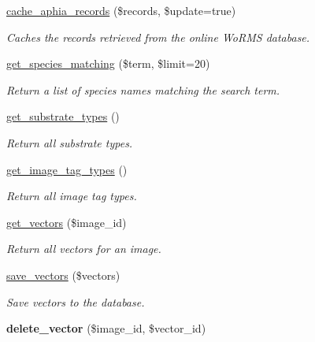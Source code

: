\begin{DoxyCompactItemize}
\item 
\hyperlink{classDatabase_a0fa69e8599adb5307cfc552ac9bf2c0d}{cache\-\_\-aphia\-\_\-records} (\$records, \$update=true)
\begin{DoxyCompactList}\small\item\em Caches the records retrieved from the online Wo\-R\-M\-S database. \end{DoxyCompactList}\item 
\hyperlink{classDatabase_a5972a2838b98ed0b7816a528ac823bec}{get\-\_\-species\-\_\-matching} (\$term, \$limit=20)
\begin{DoxyCompactList}\small\item\em Return a list of species names matching the search term. \end{DoxyCompactList}\item 
\hyperlink{classDatabase_a9549b0da67a3ad1f6e2f569d67e107ec}{get\-\_\-substrate\-\_\-types} ()
\begin{DoxyCompactList}\small\item\em Return all substrate types. \end{DoxyCompactList}\item 
\hyperlink{classDatabase_a9470debaa4dbabb3fb87f48c8bece98b}{get\-\_\-image\-\_\-tag\-\_\-types} ()
\begin{DoxyCompactList}\small\item\em Return all image tag types. \end{DoxyCompactList}\item 
\hyperlink{classDatabase_a231a45ee6f3292841b5b1272d5fac725}{get\-\_\-vectors} (\$image\-\_\-id)
\begin{DoxyCompactList}\small\item\em Return all vectors for an image. \end{DoxyCompactList}\item 
\hyperlink{classDatabase_a9cbb05bd40bab06c6d1900b9e1905613}{save\-\_\-vectors} (\$vectors)
\begin{DoxyCompactList}\small\item\em Save vectors to the database. \end{DoxyCompactList}\item 
\hypertarget{classDatabase_a764fbabef33fae2ff24290462d954a99}{{\bfseries delete\-\_\-vector} (\$image\-\_\-id, \$vector\-\_\-id)}\label{classDatabase_a764fbabef33fae2ff24290462d954a99}


\end{DoxyCompactItemize}
